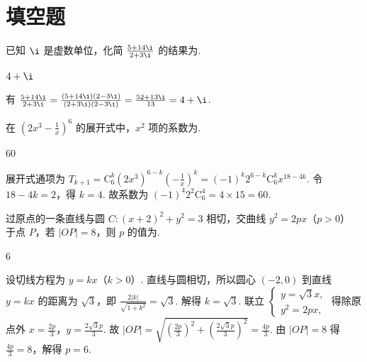 \section{填空题}

\begin{problem}
已知 \(\i\) 是虚数单位，化简 \(\frac{5+14\i}{2+3\i}\) 的结果为\fillinblank{}.
\end{problem}

\begin{answer}
\(4+\i\)
\end{answer}

\begin{solution}
有 \(\frac{5+14\i}{2+3\i}=\frac{(5+14\i)(2-3\i)}{(2+3\i)(2-3\i)}=\frac{52+13\i}{13}=4+\i\).
\end{solution}

\begin{problem}
在 \(\left( 2x^3-\frac{1}{x} \right)^6\) 的展开式中，\(x^2\) 项的系数为\fillinblank{}.
\end{problem}

\begin{answer}
60
\end{answer}

\begin{solution}
展开式通项为 \(T_{k+1}=\mathrm{C}_6^k (2x^3)^{6-k}\left(-\frac{1}{x}\right)^k=(-1)^k 2^{6-k}\mathrm{C}_6^k x^{18-4k}\). 令 \(18-4k=2\)，得 \(k=4\). 故系数为 \((-1)^4 2^2 \mathrm{C}_6^4=4\times 15=60\).
\end{solution}

\begin{problem}
过原点的一条直线与圆 \(C:(x+2)^2+y^2=3\) 相切，交曲线 \(y^2=2px\)（\(p>0\)） 于点 \(P\)，若 \(|OP|=8\)，则 \(p\) 的值为\fillinblank{}.
\end{problem}

\begin{answer}
6
\end{answer}

\begin{solution}
设切线方程为 \(y=kx\)（\(k>0\)）. 直线与圆相切，所以圆心 \((-2,0)\) 到直线 \(y=kx\) 的距离为 \(\sqrt3\)，即
\(\frac{2|k|}{\sqrt{1+k^2}}=\sqrt3\).
解得
\(k=\sqrt3\).
联立 \(\begin{cases}
y=\sqrt3 x,\\
y^2=2px,
\end{cases}\) 得除原点外
\(x=\frac{2p}{3}\)，\(y=\frac{2\sqrt3 p}{3}\).
故
\(|OP|=\sqrt{\left( \frac{2p}{3} \right)^2+\left( \frac{2\sqrt3 p}{3} \right)^2}=\frac{4p}{3}\).
由 \(|OP|=8\) 得 \(\frac{4p}{3}=8\)，解得 \(p=6\).
\end{solution}

